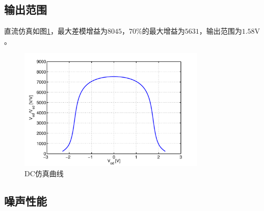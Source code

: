 \documentclass[a4paper]{article}
\newcommand{\uV}{\si{\volt}}
\begin{document}
\subsection{输出范围}
直流仿真如图\ref{commondc}，最大差模增益为$8045$，$70\%$的最大增益为$5631$，输出范围为$1.58\uV$。
\begin{figure}[htb]
    \begin{center}
        \includegraphics[width=0.8\textwidth]{common/dc.pdf}
    \end{center}
    \caption{DC仿真曲线}
    \label{commondc}
\end{figure}

\newpage
\clearpage
\subsection{噪声性能}
\end{document}
